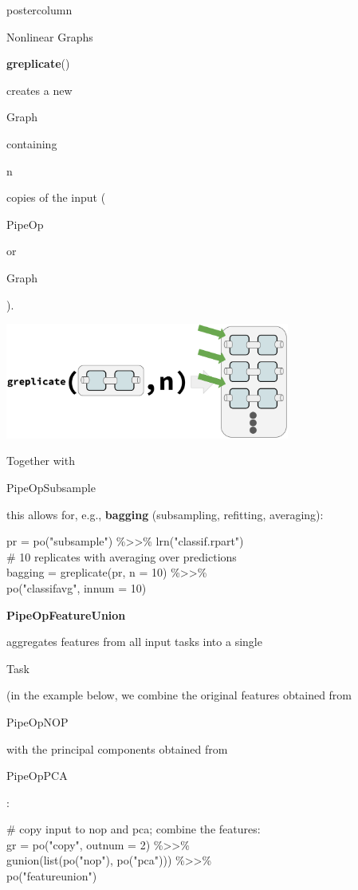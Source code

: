 \documentclass{beamer}
\newcommand{\codeinline}[1]{\begin{codeboxinline}#1\end{codeboxinline}}
\begin{document}
\begin{frame}[fragile]{}
\begin{columns}
\begin{column}{.245\textwidth}
\begin{beamercolorbox}[center]{postercolumn}
\begin{minipage}{.98\textwidth}
{\begin{myblock}{Nonlinear Graphs}
\begin{codeboxexample}
					      \end{codeboxexample}
              \vspace{0.3em}
              \codeinline{\textbf{greplicate}()} creates a new \codeinline{Graph} containing \codeinline{n} copies of the input (\codeinline{PipeOp} or \codeinline{Graph}).
              \begin{center}
                \includegraphics[width=0.7\textwidth]{img/greplicate.pdf}
              \end{center}
              Together with \codeinline{PipeOpSubsample} this allows for, e.g., \textbf{bagging} (subsampling, refitting, averaging):
              \vspace{0.3em}
              \begin{codeboxexample}
						    {\footnotesize
                  pr = po("subsample") \%>{}>\% lrn("classif.rpart")\\
                  \# 10 replicates with averaging over predictions\\
                  bagging = greplicate(pr, n = 10) \%>{}>\%\\
                  \hspace*{1ex} po("classifavg", innum = 10)}
					    \end{codeboxexample}
              \vspace{0.5em}
              \codeinline{\textbf{PipeOpFeatureUnion}} aggregates features from all input tasks into a single \codeinline{Task} (in the example below, we combine the original features obtained from \codeinline{PipeOpNOP} with the principal components obtained from \codeinline{PipeOpPCA}:
              \vspace{0.3em}
              \begin{codeboxexample}
						    {\footnotesize
                  \# copy input to nop and pca; combine the features:\\
                  gr = po("copy", outnum = 2) \%>{}>\%\\
                  \hspace*{1ex} gunion(list(po("nop"), po("pca"))) \%>{}>\%\\
                  \hspace*{1ex} po("featureunion")}
              \end{codeboxexample}
            \end{myblock}
            \vfill}
         \end{minipage}
	    \end{beamercolorbox}
		\end{column}
 \end{columns}
\end{frame}
\end{document}
